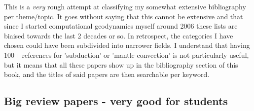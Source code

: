 This is a {\it very} rough attempt at classifying my somewhat extensive 
bibliography per theme/topic.
It goes without saying that this cannot be extensive and that since I 
started computational geodynamics myself around 2006 these lists are 
biaised towards the last 2 decades or so. 
In retrospect, the categories I have chosen could have been subdivided
into narrower fields. I understand that having 100+ references 
for 'subduction'  or 'mantle convection' is not particularly useful, 
but it means that all these papers show up in the bibliography section 
of this book, and the titles of said papers are then searchable per keyword.

\subsection{Big review papers - very good for students}

